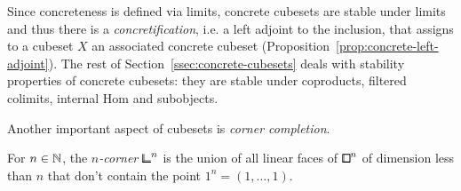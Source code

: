 Since concreteness is defined via limits, concrete cubesets are stable under limits
and thus there is a \emph{concretification}, i.e. a left adjoint to the inclusion,
that assigns to a cubeset $X$ an associated concrete cubeset (Proposition~\ref{prop:concrete-left-adjoint}).
The rest of Section~\ref{ssec:concrete-cubesets} deals with stability properties of
concrete cubesets: they are stable under coproducts, filtered colimits, internal Hom and subobjects.

Another important aspect of cubesets is \emph{corner completion}.

\begin{definition*}
For $n\in{\mathbb{N}}$, the \emph{$n$-corner ${\bbcor}^n$} is the union of all linear faces of ${\bbox}^n$
of dimension less than $n$ that don't contain the point $1^n=(1,\ldots,1)$.
\end{definition*}

